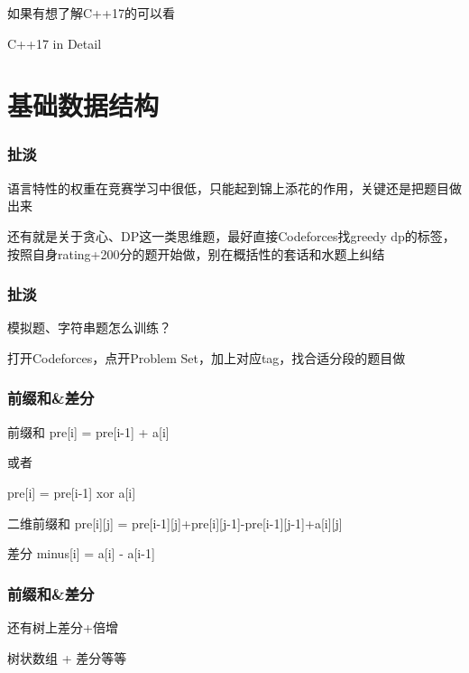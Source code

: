 \documentclass{beamer}
\begin{document}
  \begin{frame}
    如果有想了解C++17的可以看

    C++17 in Detail
  \end{frame}

  \section{基础数据结构}

  \begin{frame}
    \frametitle{扯淡}

    语言特性的权重在竞赛学习中很低，只能起到锦上添花的作用，关键还是把题目做出来

    \vspace*{1\baselineskip}

    还有就是关于贪心、DP这一类思维题，最好直接Codeforces找greedy dp的标签，按照自身rating+200分的题开始做，别在概括性的套话和水题上纠结

  \end{frame}

  \begin{frame}
    \frametitle{扯淡}

    模拟题、字符串题怎么训练？

    \vspace*{1\baselineskip}

    打开Codeforces，点开Problem Set，加上对应tag，找合适分段的题目做
  \end{frame}

  \begin{frame}[fragile]
    \frametitle{前缀和\&差分}

    \begin{block}{前缀和}
      pre[i] = pre[i-1] + a[i]
      
      或者

      pre[i] = pre[i-1] xor a[i]
    \end{block}

    \begin{block}{二维前缀和}
      pre[i][j] = pre[i-1][j]+pre[i][j-1]-pre[i-1][j-1]+a[i][j]
    \end{block}

    \begin{block}{差分}
      minus[i] = a[i] - a[i-1]
    \end{block}
  \end{frame}

  \begin{frame}
    \frametitle{前缀和\&差分}
    还有树上差分+倍增
    
    \vspace*{1\baselineskip}

    树状数组 + 差分等等
  \end{frame}
\end{document}
